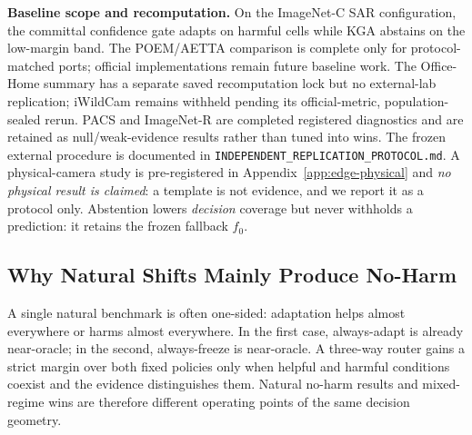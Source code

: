 \textbf{Baseline scope and recomputation.} On the ImageNet-C SAR configuration, the
committal confidence gate adapts on harmful cells while KGA abstains on the low-margin band. The
POEM/AETTA comparison is complete only for protocol-matched ports; official implementations remain
future baseline work. The Office-Home summary has a separate saved recomputation lock but no
external-lab replication; iWildCam remains withheld pending its official-metric, population-sealed
rerun. PACS and ImageNet-R are completed registered diagnostics and are
retained as null/weak-evidence results rather than tuned into wins. The frozen external procedure is
documented in \texttt{INDEPENDENT\_REPLICATION\_PROTOCOL.md}. A physical-camera study is
pre-registered in Appendix~\ref{app:edge-physical} and \emph{no physical result is claimed}: a
template is not evidence, and we report it as a protocol only. Abstention lowers \emph{decision} coverage
but never withholds a prediction: it retains the frozen fallback $f_0$.

\begin{center}
\end{center}

\subsection{Why Natural Shifts Mainly Produce No-Harm}
A single natural benchmark is often one-sided: adaptation helps almost everywhere or harms almost everywhere. In the first case, always-adapt is already near-oracle; in the second, always-freeze is near-oracle. A three-way router gains a strict margin over both fixed policies only when helpful and harmful conditions coexist and the evidence distinguishes them. Natural no-harm results and mixed-regime wins are therefore different operating points of the same decision geometry.

